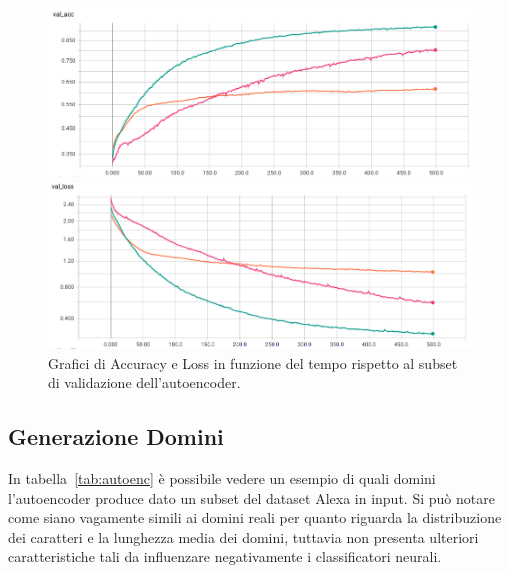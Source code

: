 \begin{figure}[!bp]
    \centering
    \begin{minipage}[t]{\linewidth}
    	\includegraphics[width=\linewidth]{figures/autoenc3.png}
    \end{minipage}
    \begin{minipage}[b]{\linewidth}
    	\includegraphics[width=\linewidth]{figures/autoenc4.png}
    \end{minipage}
    
\caption{Grafici di Accuracy e Loss in funzione del tempo rispetto al subset di validazione dell'autoencoder. \label{fig:aut2} }
\end{figure}

\newpage
\subsection{Generazione Domini}
In tabella~\ref{tab:autoenc} è possibile vedere un esempio di quali domini l'autoencoder produce dato un subset del dataset Alexa in input. Si può notare come siano vagamente simili ai domini reali per quanto riguarda la distribuzione dei caratteri e la lunghezza media dei domini, tuttavia non presenta ulteriori caratteristiche tali da influenzare negativamente i classificatori neurali.

